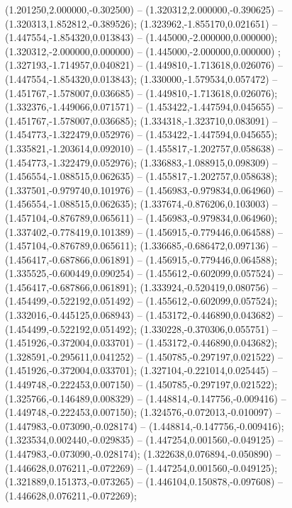  (1.201250,2.000000,-0.302500) -- (1.320312,2.000000,-0.390625) -- (1.320313,1.852812,-0.389526);
 (1.323962,-1.855170,0.021651) -- (1.447554,-1.854320,0.013843) -- (1.445000,-2.000000,0.000000);
 (1.320312,-2.000000,0.000000) -- (1.445000,-2.000000,0.000000) ;
 (1.327193,-1.714957,0.040821) -- (1.449810,-1.713618,0.026076) -- (1.447554,-1.854320,0.013843);
 (1.330000,-1.579534,0.057472) -- (1.451767,-1.578007,0.036685) -- (1.449810,-1.713618,0.026076);
 (1.332376,-1.449066,0.071571) -- (1.453422,-1.447594,0.045655) -- (1.451767,-1.578007,0.036685);
 (1.334318,-1.323710,0.083091) -- (1.454773,-1.322479,0.052976) -- (1.453422,-1.447594,0.045655);
 (1.335821,-1.203614,0.092010) -- (1.455817,-1.202757,0.058638) -- (1.454773,-1.322479,0.052976);
 (1.336883,-1.088915,0.098309) -- (1.456554,-1.088515,0.062635) -- (1.455817,-1.202757,0.058638);
 (1.337501,-0.979740,0.101976) -- (1.456983,-0.979834,0.064960) -- (1.456554,-1.088515,0.062635);
 (1.337674,-0.876206,0.103003) -- (1.457104,-0.876789,0.065611) -- (1.456983,-0.979834,0.064960);
 (1.337402,-0.778419,0.101389) -- (1.456915,-0.779446,0.064588) -- (1.457104,-0.876789,0.065611);
 (1.336685,-0.686472,0.097136) -- (1.456417,-0.687866,0.061891) -- (1.456915,-0.779446,0.064588);
 (1.335525,-0.600449,0.090254) -- (1.455612,-0.602099,0.057524) -- (1.456417,-0.687866,0.061891);
 (1.333924,-0.520419,0.080756) -- (1.454499,-0.522192,0.051492) -- (1.455612,-0.602099,0.057524);
 (1.332016,-0.445125,0.068943) -- (1.453172,-0.446890,0.043682) -- (1.454499,-0.522192,0.051492);
 (1.330228,-0.370306,0.055751) -- (1.451926,-0.372004,0.033701) -- (1.453172,-0.446890,0.043682);
 (1.328591,-0.295611,0.041252) -- (1.450785,-0.297197,0.021522) -- (1.451926,-0.372004,0.033701);
 (1.327104,-0.221014,0.025445) -- (1.449748,-0.222453,0.007150) -- (1.450785,-0.297197,0.021522);
 (1.325766,-0.146489,0.008329) -- (1.448814,-0.147756,-0.009416) -- (1.449748,-0.222453,0.007150);
 (1.324576,-0.072013,-0.010097) -- (1.447983,-0.073090,-0.028174) -- (1.448814,-0.147756,-0.009416);
 (1.323534,0.002440,-0.029835) -- (1.447254,0.001560,-0.049125) -- (1.447983,-0.073090,-0.028174);
 (1.322638,0.076894,-0.050890) -- (1.446628,0.076211,-0.072269) -- (1.447254,0.001560,-0.049125);
 (1.321889,0.151373,-0.073265) -- (1.446104,0.150878,-0.097608) -- (1.446628,0.076211,-0.072269);
